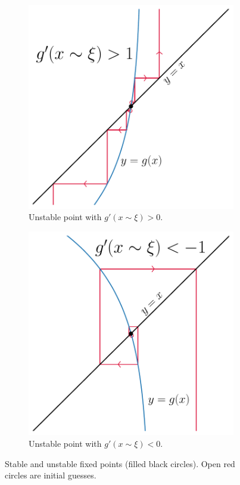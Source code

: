 \begin{figure}
\begin{subfigure}[b]{.45\linewidth}
\includegraphics[width=\linewidth]{figures/ch2_stability3.pdf}
\caption{Unstable point with $g'(x\sim \xi)>0$.}\label{fig:stable3}
\end{subfigure}
\begin{subfigure}[b]{.45\linewidth}
\includegraphics[width=\linewidth]{figures/ch2_stability4.pdf}
\caption{Unstable point with $g'(x\sim \xi)<0$.}\label{fig:stable4}
\end{subfigure}

\caption{Stable and unstable fixed points (filled black circles). Open red circles are initial guesses.}
\label{fig:stability}
\end{figure}

